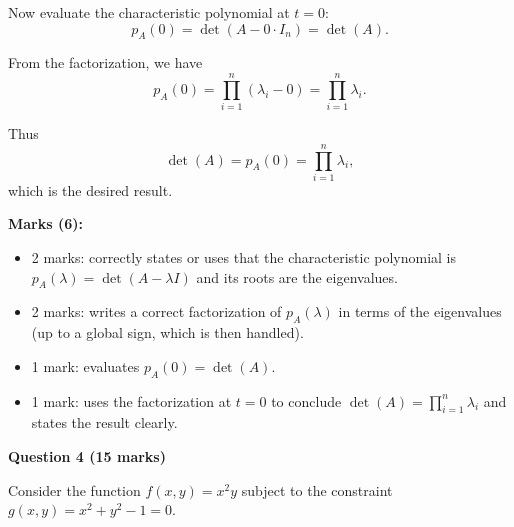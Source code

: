 \documentclass{article}
\begin{document}
\begin{enumerate}[label=(\alph*)]
\begin{mdframed}[linecolor=black, linewidth=1pt]
    Now evaluate the characteristic polynomial at $t=0$:
    \[
    p_A(0) = \det(A - 0 \cdot I_n) = \det(A).
    \]
    
    From the factorization, we have
    \[
    p_A(0) = \prod_{i=1}^n (\lambda_i - 0)
           = \prod_{i=1}^n \lambda_i.
    \]
    
    Thus
    \[
    \det(A) = p_A(0) = \prod_{i=1}^n \lambda_i,
    \]
    which is the desired result.
    
    \textbf{Marks (6):}
    \begin{itemize}
      \item 2 marks: correctly states or uses that the characteristic polynomial is $p_A(\lambda)=\det(A-\lambda I)$ and its roots are the eigenvalues.
      \item 2 marks: writes a correct factorization of $p_A(\lambda)$ in terms of the eigenvalues (up to a global sign, which is then handled).
      \item 1 mark: evaluates $p_A(0)=\det(A)$.
      \item 1 mark: uses the factorization at $t=0$ to conclude $\det(A)=\prod_{i=1}^n\lambda_i$ and states the result clearly.
    \end{itemize}
    \end{mdframed}
    
\end{enumerate}

\bigskip


\textbf{Question 4 (15 marks)}

Consider the function $f(x,y)=x^2y$ subject to the constraint $g(x,y) = x^2+y^2-1 = 0$.
\end{document}
